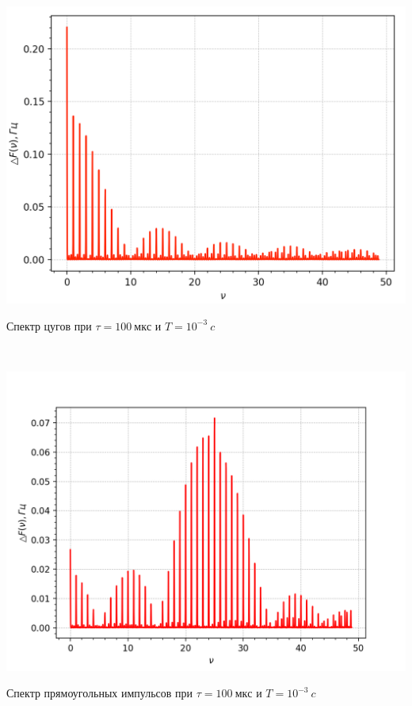 \documentclass[a4paper,12pt]{article} %
\begin{document}
\begin{minipage}{0.45\textwidth}
\includegraphics[width=\linewidth]{1.png}\\
\begin{center}
Спектр цугов при $\tau = 100 \ мкс $ и $T = 10^{-3} \ c$
\end{center}
\end{minipage}
\begin{minipage}{0.05\textwidth}
\
\end{minipage}
\begin{minipage}{0.45\textwidth}
\includegraphics[width=\linewidth]{4.png}\\
\begin{center}
Спектр прямоугольных импульсов при $\tau = 100 \ мкс $ и $T = 10^{-3} \ c$
\end{center}
\end{minipage}
\end{document}
